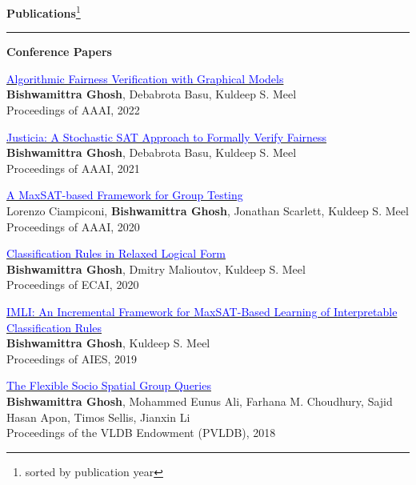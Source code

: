 \documentclass[a4paper,10pt,final]{article}
\newcommand{\Sep}{\vspace{1.5em}}
\newcommand{\SmallSep}{\vspace{0.5em}}
\newcommand{\blue}[1]{\textcolor{blue}{#1}}
\begin{document}
\Sep
\Large { \textbf{Publications}}\footnote{sorted by publication year}\\
\noindent\rule{\textwidth}{1pt}

\SmallSep
\large { \textbf{Conference Papers}}
\normalsize


	

	
	
\SmallSep

	\begin{etaremune}
		
		\item \href{https://arxiv.org/pdf/2109.09447.pdf}{\blue{Algorithmic Fairness Verification with Graphical Models}} \\
		\textbf{Bishwamittra Ghosh}, Debabrota Basu, Kuldeep S. Meel\\
		Proceedings of AAAI, 2022
		
		
		
		\item \href{https://arxiv.org/pdf/2009.06516.pdf}{\blue{Justicia: A Stochastic SAT Approach to Formally Verify Fairness}} \\
		\textbf{Bishwamittra Ghosh}, Debabrota Basu, Kuldeep S. Meel\\
		Proceedings of AAAI, 2021
		
		
	
		
		\item 	\href{https://bishwamittra.github.io/publication/aaai_2020/AAAI-CiampiconiL.690.pdf}{\blue{A MaxSAT-based Framework for Group Testing}} \\
		Lorenzo Ciampiconi, \textbf{Bishwamittra Ghosh}, Jonathan Scarlett, Kuldeep S. Meel\\
		Proceedings of AAAI, 2020
		
		\item \href{https://bishwamittra.github.io/publication/ecai_2020/paper.pdf}{\blue{Classification Rules in Relaxed Logical Form
		}} \\
		\textbf{Bishwamittra Ghosh}, Dmitry Malioutov, Kuldeep S. Meel\\
		Proceedings of ECAI, 2020
		
		\item \href{https://bishwamittra.github.io/publication/imli-ghosh.pdf}{\blue{IMLI: An Incremental Framework for MaxSAT-Based Learning of Interpretable Classification Rules}}\\
		\textbf{Bishwamittra Ghosh}, Kuldeep S. Meel\\
		Proceedings of AIES, 2019
		
		\item 	\href{https://bishwamittra.github.io/publication/fssgq-ghosh.pdf}{\blue{The Flexible Socio Spatial Group Queries}}\\
		\textbf{Bishwamittra Ghosh}, Mohammed Eunus Ali, Farhana M. Choudhury,
		Sajid Hasan Apon, Timos Sellis, Jianxin Li\\
		Proceedings of the VLDB Endowment (PVLDB), 2018
		
	\end{etaremune}
\end{document}
